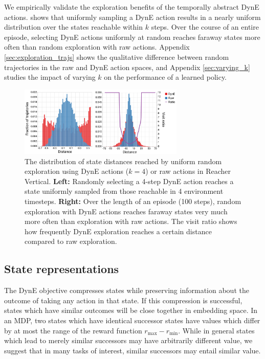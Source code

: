We empirically validate the exploration benefits of the temporally abstract DynE actions.
 shows that uniformly sampling a DynE action results in a nearly uniform distribution over the states reachable within $k$ steps.
Over the course of an entire episode, selecting DynE actions uniformly at random reaches faraway states more often than random exploration with raw actions.
Appendix \ref{sec:exploration_trajs} shows the qualitative difference between random trajectories in the raw and DynE action spaces, and Appendix \ref{sec:varying_k} studies the impact of varying $k$ on the performance of a learned policy.

\begin{figure}[h]
\centering
    \includegraphics[width=0.7\textwidth]{figures/dyne/exploration_histograms_ratio_sidelegend.pdf}
\caption{The distribution of state distances reached by uniform random exploration using DynE actions ($k=4$) or raw actions in Reacher Vertical. \textbf{Left:} Randomly selecting a 4-step DynE action reaches a state uniformly sampled from those reachable in 4 environment timesteps. \textbf{Right:} Over the length of an episode (100 steps), random exploration with DynE actions reaches faraway states very much more often than exploration with raw actions. The visit ratio shows how frequently DynE exploration reaches a certain distance compared to raw exploration.}
\label{fig:exploration_histogram}
\end{figure}

\subsection{State representations}

The DynE objective compresses states while preserving information about the outcome of taking any action in that state.
If this compression is successful, states which have similar outcomes will be close together in embedding space.
In an MDP, two states which have identical successor states have values which differ by at most the range of the reward function $r_{\max} - r_{\min}$.
While in general states which lead to merely similar successors may have arbitrarily different value, we suggest that in many tasks of interest, similar successors may entail similar value.


